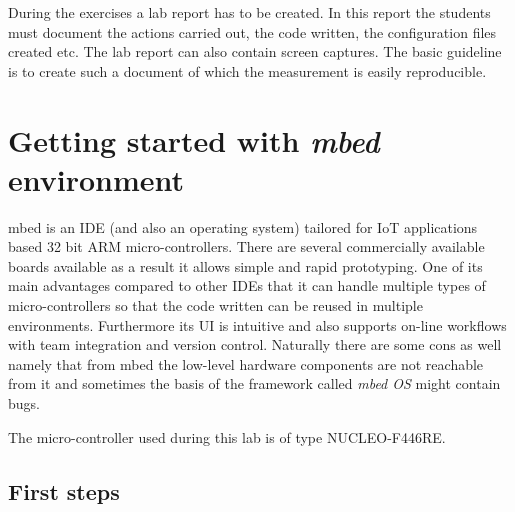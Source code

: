 \documentclass[a4paper]{article}
\begin{document}
During the exercises a lab report has to be created. In this report the students must document the actions carried out, the code written, the configuration files created etc. The lab report can also contain screen captures. The basic guideline is to create such a document of which the measurement is easily reproducible. 

\section{Getting started with \emph{\textbf{mbed}} environment}

mbed is an IDE (and also an operating system) tailored for IoT applications based 32 bit ARM micro-controllers. There are several commercially available boards available as a result it allows simple and rapid prototyping. One of its main advantages compared to other IDEs that it can handle multiple types of micro-controllers so that the code written can be reused in multiple environments. Furthermore its UI is intuitive and also supports on-line workflows with team integration and version control. Naturally there are some cons as well namely that from mbed the low-level hardware components are not reachable from it and sometimes the basis of the framework called \emph{mbed OS} might contain bugs.

The micro-controller used during this lab is of type NUCLEO-F446RE.

\subsection{First steps}
\end{document}
